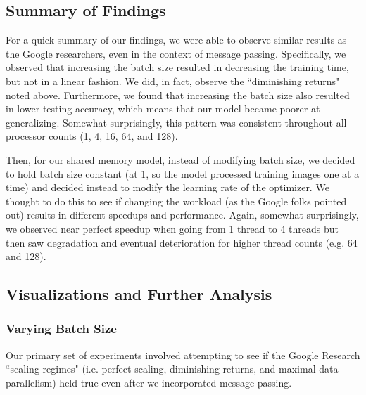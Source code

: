 \documentclass{article}
\begin{document}
\subsection{Summary of Findings}

\noindent For a quick summary of our findings, we were able to observe similar results as the Google researchers, even in the context of message passing. Specifically, we observed that increasing the batch size resulted in decreasing the training time, but not in a linear fashion. We did, in fact, observe the ``diminishing returns" noted above. Furthermore, we found that increasing the batch size also resulted in lower testing accuracy, which means that our model became poorer at generalizing. Somewhat surprisingly, this pattern was consistent throughout all processor counts (1, 4, 16, 64, and 128).

Then, for our shared memory model, instead of modifying batch size, we decided to hold batch size constant (at 1, so the model processed training images one at a time) and decided instead to modify the learning rate of the optimizer. We thought to do this to see if changing the workload (as the Google folks pointed out) results in different speedups and performance. Again, somewhat surprisingly, we observed near perfect speedup when going from 1 thread to 4 threads but then saw degradation and eventual deterioration for higher thread counts (e.g. 64 and 128).

\subsection{Visualizations and Further Analysis}

\subsubsection{Varying Batch Size}

Our primary set of experiments involved attempting to see if the Google Research ``scaling regimes" (i.e. perfect scaling, diminishing returns, and maximal data parallelism) held true even after we incorporated message passing.
\end{document}
